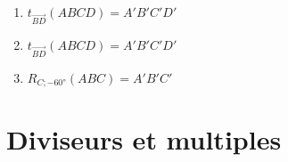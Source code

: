 \begin{solution}
\begin{enumerate}
          \begin{center}
            
          \end{center}
    \item $t_{\overrightarrow{BD}}\left( ABCD \right) = A'B'C'D'$
          \begin{center}
            
          \end{center}
    \item $t_{\overrightarrow{BD}}\left( ABCD \right) = A'B'C'D'$
          \begin{center}
            
          \end{center}
          \newpage
    \item $R_{C; \ang{-60}}\left( ABC \right) = A'B'C'$
          \begin{center}
            
          \end{center}
  \end{enumerate}
\end{solution}

\section{Diviseurs et multiples}

